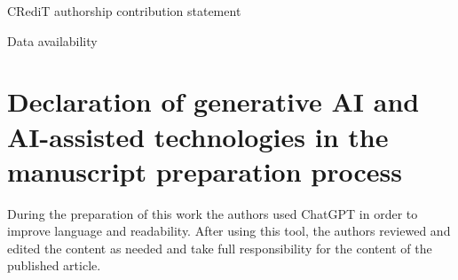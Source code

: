 \documentclass[times,review,10pt]{elsarticle}
\begin{document}









CRediT authorship contribution statement

Data availability

\section{Declaration of generative AI and AI-assisted technologies in the manuscript preparation process}
During the preparation of this work the authors used ChatGPT in order to improve language and readability. After using this tool, the authors reviewed and edited the content as needed and take full responsibility for the content of the published article.
















\end{document}
